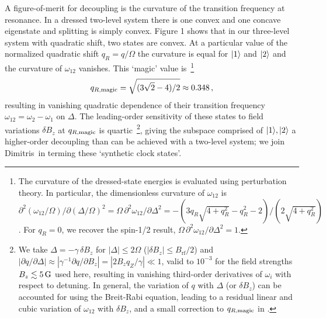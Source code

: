 \documentclass[aps,prl,reprint,superscriptaddress,floatfix]{revtex4-1}
\begin{document}
A figure-of-merit for decoupling is the curvature of the transition frequency at resonance.
In a dressed two-level system there is one convex and one concave eigenstate and splitting is simply convex.
Figure 1 shows that in our three-level system with quadratic shift, two states are convex.
At a particular value of the normalized quadratic shift $q_R=q/\Omega$ the curvature is equal for $\vert 1 \rangle $ and $\vert 2 \rangle $ and the curvature of $\omega_{12}$ vanishes.
This `magic' value is~\footnote{
  The curvature of the dressed-state energies is evaluated using perturbation theory. In particular, the dimensionless curvature of $\omega_{12}$ is $\partial^2(\omega_{12}/\Omega)/\partial(\Delta/\Omega)^2 = \Omega \, \partial^2\omega_{12}/\partial \Delta^2 = -(3 q_R \sqrt{4 + q_R^2} - q_R^2 - 2)/(2 \sqrt{4 + q_R^2})$. For $q_R = 0$, we recover the spin-1/2 result, $\Omega\, \partial^2\omega_{12}/\partial \Delta^2 = 1$.}
\begin{align}
\label{eq:qRmagic}
    q_{R,\text{magic}} = \sqrt{(3\sqrt{2} - 4)/2} \approx 0.348 \, ,
\end{align}
resulting in vanishing quadratic dependence of their transition frequency $\omega_{12}=\omega_2 - \omega_1$ on $\Delta$.
The leading-order sensitivity of these states to field variations $\delta B_z$ at $q_{R,\text{magic}}$ is quartic~\footnote{
    We take $\Delta = -\gamma \, \delta B_z$ for $|\Delta | \leq 2\Omega$ ($| \delta B_z | \leq B_{\text{rf}}/2$) and $| \partial q / \partial \Delta | \approx | \gamma^{-1} \partial q / \partial B_z | = |2 B_z q_Z / \gamma| \ll 1$, valid to $10^{-3}$ for the field strengths $B_z \lesssim \unit[5]{G}$ used here, resulting in vanishing third-order derivatives of $\omega_i$ with respect to detuning. 
    In general, the variation of $q$ with $\Delta$ (or $\delta B_z$) can be accounted for using the Breit-Rabi equation, leading to a residual linear and cubic variation of $\omega_{12}$ with $\delta B_z$, and a small correction to $q_{R,\text{magic}}$ in .},
giving the subspace comprised of ${\vert 1 \rangle ,\vert 2 \rangle }$ a higher-order decoupling than can be achieved with a two-level system; we join Dimitris~\etal in terming these `synthetic clock states'.
\end{document}
